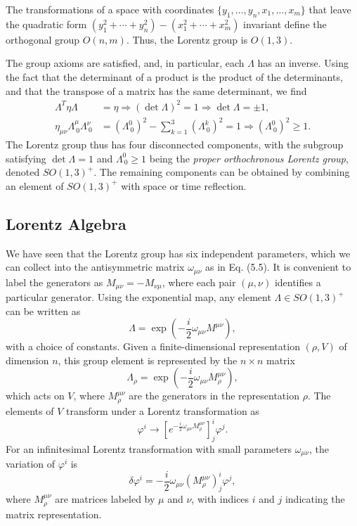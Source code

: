 The transformations of a space with coordinates $\{ y_1, \dots, y_n, x_1, \dots, x_m \}$ that leave the quadratic form $(y_1^2 + \cdots + y_n^2) - (x_1^2 + \cdots + x_m^2)$ invariant define the orthogonal group $O(n, m)$. Thus, the Lorentz group is $O(1, 3)$.

The group axioms are satisfied, and, in particular, each $\Lambda$ has an inverse. Using the fact that the determinant of a product is the product of the determinants, and that the transpose of a matrix has the same determinant, we find
\begin{align}
\Lambda^T \eta \Lambda &= \eta \Rightarrow (\det \Lambda)^2 = 1 \Rightarrow \det \Lambda = \pm 1, \\
\eta_{\mu \nu} \Lambda^\mu_{\ 0} \Lambda^\nu_{\ 0} &= (\Lambda^0_{\ 0})^2 - \sum_{k=1}^3 (\Lambda^k_{\ 0})^2 = 1 \Rightarrow (\Lambda^0_{\ 0})^2 \geq 1.
\end{align}
The Lorentz group thus has four disconnected components, with the subgroup satisfying $\det \Lambda = 1$ and $\Lambda^0_{\ 0} \geq 1$ being the \emph{proper orthochronous Lorentz group}, denoted $SO(1, 3)^+$. The remaining components can be obtained by combining an element of $SO(1, 3)^+$ with space or time reflection.

\subsection{Lorentz Algebra}

We have seen that the Lorentz group has six independent parameters, which we can collect into the antisymmetric matrix $\omega_{\mu \nu}$ as in Eq. (5.5). It is convenient to label the generators as $M_{\mu \nu} = -M_{\nu \mu}$, where each pair $(\mu, \nu)$ identifies a particular generator. Using the exponential map, any element $\Lambda \in SO(1, 3)^+$ can be written as
\[
\Lambda = \exp \left( -\frac{i}{2} \omega_{\mu \nu} M^{\mu \nu} \right),
\]
with a choice of constants. Given a finite-dimensional representation $(\rho, V)$ of dimension $n$, this group element is represented by the $n \times n$ matrix
\[
\Lambda_\rho = \exp \left( -\frac{i}{2} \omega_{\mu \nu} M^{\mu \nu}_\rho \right),
\]
which acts on $V$, where $M^{\mu \nu}_\rho$ are the generators in the representation $\rho$. The elements of $V$ transform under a Lorentz transformation as
\[
\varphi^i \to \left[ e^{-\frac{i}{2} \omega_{\mu \nu} M^{\mu \nu}_\rho} \right]^i_j \varphi^j.
\]
For an infinitesimal Lorentz transformation with small parameters $\omega_{\mu \nu}$, the variation of $\varphi^i$ is
\[
\delta \varphi^i = -\frac{i}{2} \omega_{\mu \nu} \left( M^{\mu \nu}_\rho \right)^i_j \varphi^j,
\]
where $M^{\mu \nu}_\rho$ are matrices labeled by $\mu$ and $\nu$, with indices $i$ and $j$ indicating the matrix representation.

